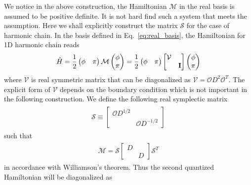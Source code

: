 We notice in the above construction, the Hamiltonian $\mathcal{M}$ in the real basis is assumed to be positive definite. It is not hard find such a system that meets the assumption. Here we shall explicitly construct the matrix $\mathcal{S}$ for the case of harmonic chain. In the basis defined in Eq.~\eqref{eq:real_basis}, the Hamiltonian for 1D harmonic chain reads
\begin{eqnarray}\begin{aligned}
\hat{H}
=\frac{1}{2}
\begin{pmatrix}
\phi & \pi
\end{pmatrix}
\mathcal{M}
\begin{pmatrix}
\phi\\
\pi
\end{pmatrix}
=\frac{1}{2}
\begin{pmatrix}
\phi & \pi
\end{pmatrix}
\begin{bmatrix}
\mathcal{V} \\
& {\bf I}
\end{bmatrix}
\begin{pmatrix}
\phi\\
\pi
\end{pmatrix}
\end{aligned}\end{eqnarray}
where $\mathcal{V}$ is real symmetric matrix that can be diagonalized as $\mathcal{V}=\mathcal{O}D^2\mathcal{O}^T$. The explicit form of $\mathcal{V}$ depends on the boundary condition which is not important in the following construction. We define the following real symplectic matrix
\begin{eqnarray}\begin{aligned}
\mathcal{S}\equiv
\begin{bmatrix}
\mathcal{O}D^{1/2} \\
& \mathcal{O}D^{-1/2}
\end{bmatrix}
\end{aligned}\end{eqnarray}
such that 
\begin{eqnarray}\begin{aligned}
\mathcal{M}=\mathcal{S}
\begin{bmatrix}
D \\ 
& D
\end{bmatrix}
\mathcal{S}^T
\end{aligned}\end{eqnarray}
in accordance with Williamson's theorem. Thus the second quantized Hamiltonian will be diagonalized as
